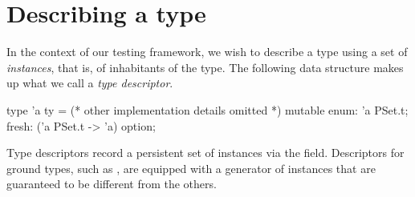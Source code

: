 
\section{Describing a type}

In the context of our testing framework, we wish to describe a type using a set
of \emph{instances}, that is, of inhabitants of the type. The following data
structure makes up what we call a \emph{type descriptor}.

\begin{ocamlcode}
type 'a ty = {
  (* other implementation details omitted *)
  mutable enum: 'a PSet.t;
  fresh: ('a PSet.t -> 'a) option;
}
\end{ocamlcode}

Type descriptors record a persistent set of instances via the 
field. Descriptors for ground types, such as , are equipped with a
generator of  instances that are guaranteed to be different from the
others.
